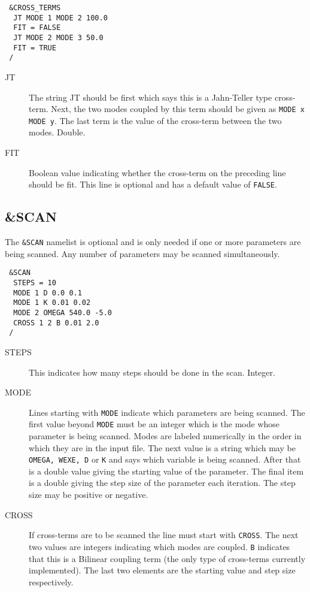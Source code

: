\documentclass{article}
\begin{document}
\begin{verbatim}
 &CROSS_TERMS
  JT MODE 1 MODE 2 100.0
  FIT = FALSE
  JT MODE 2 MODE 3 50.0
  FIT = TRUE
 /
\end{verbatim}

\begin{description}
\item[JT] The string JT should be first which says this is a Jahn-Teller type cross-term.
Next, the two modes coupled by this term should be given as {\tt MODE x MODE y}. 
The last term is the value of the cross-term between the two modes. Double.

\item[FIT] Boolean value indicating whether the cross-term on the preceding line
should be fit. This line is optional and has a default value of {\tt FALSE}.

\end{description}

\subsection{\&SCAN} \label{scan}

The {\tt \&SCAN} namelist is optional and is only needed if one or more parameters
are being scanned. Any number of parameters may be scanned simultaneously.

\begin{verbatim}
 &SCAN
  STEPS = 10
  MODE 1 D 0.0 0.1
  MODE 1 K 0.01 0.02
  MODE 2 OMEGA 540.0 -5.0
  CROSS 1 2 B 0.01 2.0
 /
\end{verbatim}

\begin{description}
\item[STEPS] This indicates how many steps should be done in the scan.
Integer.

\item[MODE] Lines starting with {\tt MODE} indicate which parameters are being 
scanned. The first value beyond {\tt MODE} must be an integer which is the mode
whose parameter is being scanned. Modes are labeled numerically in the order
in which they are in the input file. The next value is a string which may be
{\tt OMEGA, WEXE, D} or {\tt K} and says which variable is being scanned. After that 
is a double value giving the starting value of the parameter. The final
item is a double giving the step size of the parameter each iteration. 
The step size may be positive or negative.

\item[CROSS] If cross-terms are to be scanned the line must start with 
{\tt CROSS}. The next two values are integers indicating which modes are coupled.
{\tt B} indicates that this is a Bilinear coupling term (the only type
of cross-terms currently implemented). The last two elements are the starting
value and step size respectively.

\end{description}
\end{document}
